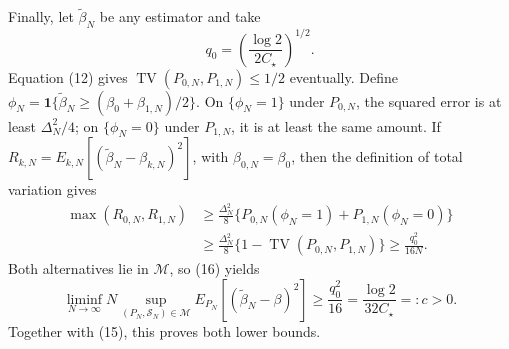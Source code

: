 Finally, let \(\widetilde\beta_N\) be any estimator and take
\[
 q_0=\left(\frac{\log2}{2C_\star}\right)^{1/2}.
\]
Equation (12) gives \(\operatorname{TV}(P_{0,N},P_{1,N})\leq1/2\) eventually.  Define
\(\phi_N=\mathbf 1\{\widetilde\beta_N\geq(\beta_0+\beta_{1,N})/2\}\).  On \(\{\phi_N=1\}\) under \(P_{0,N}\), the squared error is at least \(\Delta_N^2/4\); on \(\{\phi_N=0\}\) under \(P_{1,N}\), it is at least the same amount.  If
\(R_{k,N}=E_{k,N}[(\widetilde\beta_N-\beta_{k,N})^2]\), with \(\beta_{0,N}=\beta_0\), then the definition of total variation gives
\[
 \begin{aligned}
 \max(R_{0,N},R_{1,N})
 &\geq\frac{\Delta_N^2}{8}
 \{P_{0,N}(\phi_N=1)+P_{1,N}(\phi_N=0)\}\\
 &\geq\frac{\Delta_N^2}{8}
 \{1-\operatorname{TV}(P_{0,N},P_{1,N})\}
 \geq\frac{q_0^2}{16N}.
 \end{aligned}
 \tag{16}
\]
Both alternatives lie in \(\mathcal M\), so (16) yields
\[
 \liminf_{N\to\infty}N
 \sup_{(P_N,\mathcal S_N)\in\mathcal M}
 E_{P_N}[(\widetilde\beta_N-\beta)^2]
 \geq\frac{q_0^2}{16}
 =\frac{\log2}{32C_\star}=:c>0.
\]
Together with (15), this proves both lower bounds.
